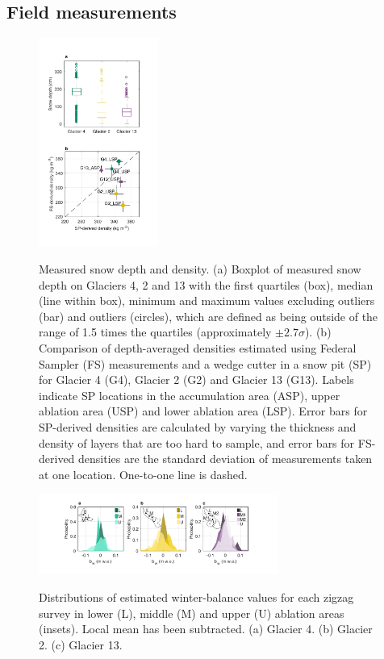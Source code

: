 \documentclass[review,oneside, letterpaper]{igs}
\begin{document}
\subsection{Field measurements}

\begin{figure}
	\centering
	\includegraphics[width =0.35\textwidth]{DepthBoxplot_SPvsFS.pdf}\\
	\caption{Measured snow depth and density. (a) Boxplot of measured snow depth on Glaciers 4, 2 and 13 with the first quartiles (box), median (line within box), minimum and maximum values excluding outliers (bar) and outliers (circles), which are defined as being outside of the range of 1.5 times the quartiles (approximately $\pm2.7\sigma$). (b) Comparison of depth-averaged densities estimated using Federal Sampler (FS) measurements and  a wedge cutter in a snow pit (SP)  for Glacier 4 (G4), Glacier 2 (G2) and Glacier 13 (G13). Labels indicate SP locations in the accumulation area (ASP), upper ablation area (USP) and lower ablation area (LSP). Error bars for SP-derived densities are calculated by varying the thickness and density of layers that are too hard to sample, and error bars for FS-derived densities are the standard deviation of measurements taken at one location. One-to-one line is dashed.}
	\label{fig:DepthBoxplot_SPvsFS}
\end{figure}

\begin{figure}
	\centering
	\includegraphics[width =0.7\textwidth]{ZigzagHistogram.pdf}\\
	\caption{Distributions of estimated winter-balance values for each zigzag survey in lower (L), middle (M) and upper (U) ablation areas (insets). Local mean has been subtracted. (a) Glacier 4. (b) Glacier 2. (c) Glacier 13.}
	\label{fig:ZigzagHistogram}
\end{figure}
\end{document}
